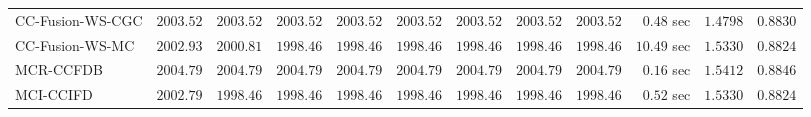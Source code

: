 \begin{table}[H]
\begin{tabular}{lrrrrrrrrrrr}
    CC-Fusion-WS-CGC & $      2003.52$ & $      2003.52$ & $      2003.52$ & $      2003.52$ & $      2003.52$ & $      2003.52$ & $      2003.52$ & $      2003.52$ & $         0.48$ sec    & $       1.4798$  & $       0.8830$ \\ 
     CC-Fusion-WS-MC & $      2002.93$ & $      2000.81$ & $      1998.46$ & $      1998.46$ & $      1998.46$ & $      1998.46$ & $      1998.46$ & $      1998.46$ & $        10.49$ sec    & $       1.5330$  & $       0.8824$ \\ 
\cmidrule{1-1} 
           MCR-CCFDB & $      2004.79$ & $      2004.79$ & $      2004.79$ & $      2004.79$ & $      2004.79$ & $      2004.79$ & $      2004.79$ & $      2004.79$ & $         0.16$ sec    & $       1.5412$  & $       0.8846$ \\ 
\cmidrule{1-1} 
           MCI-CCIFD & $      2002.79$ & $      1998.46$ & $      1998.46$ & $      1998.46$ & $      1998.46$ & $      1998.46$ & $      1998.46$ & $      1998.46$ & $         0.52$ sec    & $       1.5330$  & $       0.8824$ \\ 
\bottomrule
\end{tabular}
\end{table}

